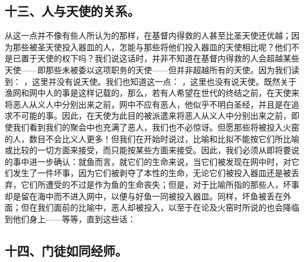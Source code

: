 \subsection{十三、人与天使的关系。}

从这一点并不像有些人所认为的那样，在基督内得救的人甚至比圣天使还优越；因为那些被圣天使投入器皿的人，怎能与那些将他们投入器皿的天使相比呢？他们不是已置于天使的权下吗？我们说这话时，并非不知道在基督内得救的人会超越某些天使——即那些未被委以这项职务的天使——但并非超越所有的天使。因为我们读到： ，这里并没有说天使。我们也知道这一点： ，这里也没有说天使。既然关于渔网和网中人的事是这样记载的，那么，若有人希望在世代的终结之前，在天使来将恶人从义人中分别出来之前，网中不应有恶人，他似乎不明白圣经，并且是在追求不可能的事。因此，在天使为此目的被派遣来将恶人从义人中分别出来之前，即使我们看到我们的聚会中也充满了恶人，我们也不必惊讶。但愿那些将被投入火窑的人，数目不会比义人更多！但我们在开始时说过，比喻和比拟不能按它们所比喻或比较的一切方面来接受，而只能按某些方面来接受。因此，我们必须从即将要说的事中进一步确认：就鱼而言，就它们的生命来说，当它们被发现在网中时，对它们发生了一件坏事，因为它们被剥夺了本性的生命，无论它们被投入器皿还是被丢弃，它们所遭受的不过是作为鱼的生命丧失；但是，对于比喻所指的那些人，坏事却是留在海中而不进入网中，以便与好鱼一同被投入器皿。同样，坏鱼被丢在外面；但在我们面前的比喻中，恶人却被投入，以至于在论及火窑时所说的也会降临到他们身上——等等，直到这些话： \par


\subsection{十四、门徒如同经师。}

